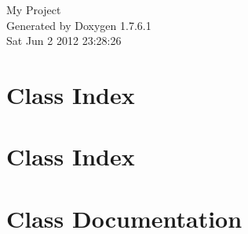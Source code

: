 \documentclass[a4paper]{book}
\begin{document}
\hypersetup{pageanchor=false,citecolor=blue}
\begin{titlepage}
\vspace*{7cm}
\begin{center}
{\Large \-My \-Project }\\
\vspace*{1cm}
{\large \-Generated by Doxygen 1.7.6.1}\\
\vspace*{0.5cm}
{\small Sat Jun 2 2012 23:28:26}\\
\end{center}
\end{titlepage}
\clearemptydoublepage
{}
\tableofcontents
\clearemptydoublepage
{}
\hypersetup{pageanchor=true,citecolor=blue}
\chapter{\-Class \-Index}

\chapter{\-Class \-Index}

\chapter{\-Class \-Documentation}


























\printindex
\end{document}
